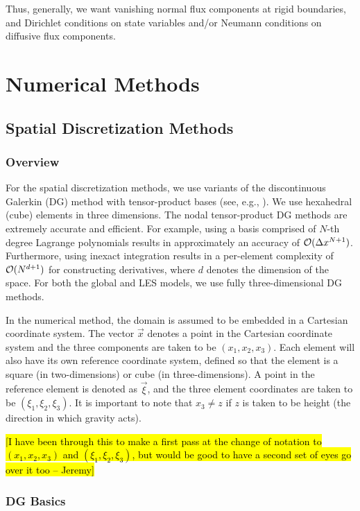 \documentclass{article}
\begin{document}
{Thus, generally, we want vanishing normal flux components at rigid boundaries, and Dirichlet conditions on state variables and/or Neumann conditions on diffusive flux components.

\section{Numerical Methods}
\label{sec:numerical_methods}

\subsection{Spatial Discretization Methods}

\subsubsection{Overview}
For the spatial discretization methods, we use variants of the discontinuous Galerkin (DG) method with tensor-product bases (see, e.g., \citealt{giraldo:2008a, abdi:2016}). We use hexahedral (cube) elements in three dimensions.  The nodal tensor-product DG methods are extremely accurate and efficient.  For example, using a basis comprised of $N$-th degree Lagrange polynomials results in approximately an accuracy of $\mathcal{O}(\Delta x^{N+1})$. Furthermore, using inexact integration results in a per-element complexity of $\mathcal{O}(N^{d+1})$ for constructing derivatives, where $d$ denotes the dimension of the space. For both the global and LES models, we use fully three-dimensional DG methods.

In the numerical method, the domain is assumed to be embedded in a Cartesian
coordinate system. The vector $\vec{x}$ denotes a point in the Cartesian
coordinate system and the three components are taken to be $(x_{1}, x_{2},
x_{3})$. Each element will also have its own reference coordinate system, defined
so that the element is a square (in two-dimensions) or cube (in
three-dimensions). A point in the reference element is denoted as $\vec{\xi}$,
and the three element coordinates are taken to be $(\xi_{1}, \xi_{2}, \xi_{3})$.
It is important to note that $x_{3} \ne z$ if $z$ is taken to be height (the
direction in which gravity acts).

\hl{[I have been through this to make a first pass at the change of notation to
$(x_{1}, x_{2}, x_{3})$ and $(\xi_{1}, \xi_{2}, \xi_{3})$, but would be good to
have a second set of eyes go over it too -- Jeremy]}


\subsubsection{DG Basics}

}
\end{document}
